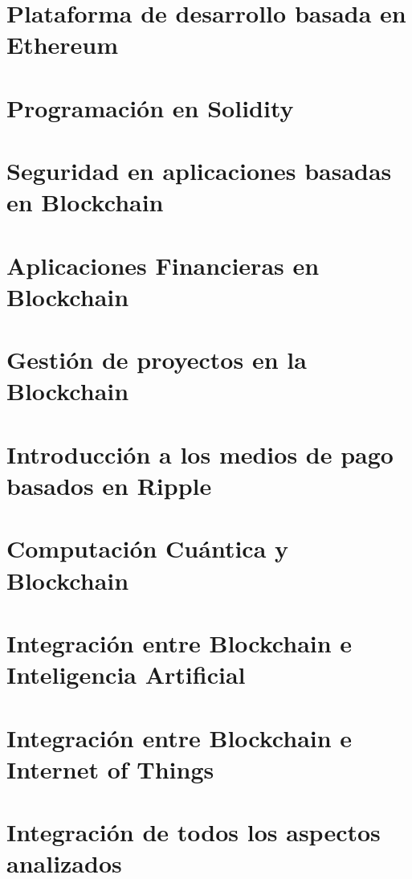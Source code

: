 \documentclass[]{book}
\begin{document}
    \chapter{ Plataforma de desarrollo basada en Ethereum }
    \chapter{ Programación en Solidity }
    \chapter{ Seguridad en aplicaciones basadas en Blockchain }
    \chapter{ Aplicaciones Financieras en Blockchain }
    \chapter{ Gestión de proyectos en la Blockchain }
    \chapter{ Introducción a los medios de pago basados en Ripple }
    \chapter{ Computación Cuántica y Blockchain }
    \chapter{ Integración entre Blockchain e Inteligencia Artificial }
    \chapter{ Integración entre Blockchain e Internet of Things }
    \chapter{ Integración de todos los aspectos analizados }
\end{document}
